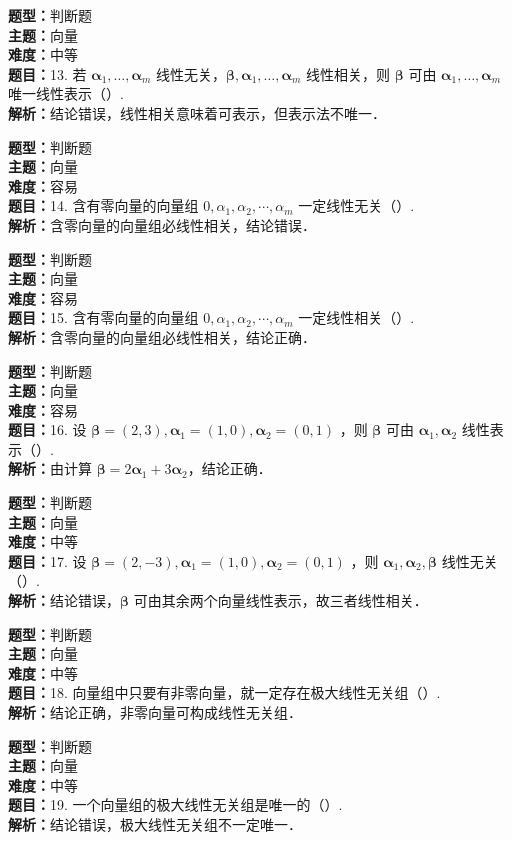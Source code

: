 \documentclass{ctexart}
\newenvironment{question}[5]{%
	\noindent\textbf{题型：}#1\\
	\textbf{主题：}#2\\
	\textbf{难度：}#3\\
	\textbf{题目：}#4\\
	\textbf{解析：}#5\\
	\vspace{1em}
}{}
\begin{document}
	\begin{question}
		{判断题}
		{向量}
		{中等}
		{13. 若 \(\boldsymbol{\alpha}_1,\dots,\boldsymbol{\alpha}_m\) 线性无关，\(\boldsymbol{\beta}, \boldsymbol{\alpha}_1,\dots,\boldsymbol{\alpha}_m\) 线性相关，则 \(\boldsymbol{\beta}\) 可由 \(\boldsymbol{\alpha}_1,\dots,\boldsymbol{\alpha}_m\) 唯一线性表示（）. }
		{结论错误，线性相关意味着可表示，但表示法不唯一．}
	\end{question}
	
	\begin{question}
		{判断题}
		{向量}
		{容易}
		{14. 含有零向量的向量组 \(0, \alpha_1, \alpha_2, \cdots, \alpha_m\) 一定线性无关（）. }
		{含零向量的向量组必线性相关，结论错误．}
	\end{question}
	
	\begin{question}
		{判断题}
		{向量}
		{容易}
		{15. 含有零向量的向量组 \(0, \alpha_1, \alpha_2, \cdots, \alpha_m\) 一定线性相关（）. }
		{含零向量的向量组必线性相关，结论正确．}
	\end{question}
	
	\begin{question}
		{判断题}
		{向量}
		{容易}
		{16. 设 \(\boldsymbol{\beta}=(2,3), \boldsymbol{\alpha}_1=(1,0), \boldsymbol{\alpha}_2=(0,1)\) ，则 \(\boldsymbol{\beta}\) 可由 \(\boldsymbol{\alpha}_1, \boldsymbol{\alpha}_2\) 线性表示（）. }
		{由计算 \(\boldsymbol{\beta}=2\boldsymbol{\alpha}_1+3\boldsymbol{\alpha}_2\)，结论正确．}
	\end{question}
	
	\begin{question}
		{判断题}
		{向量}
		{中等}
		{17. 设 \(\boldsymbol{\beta}=(2,-3), \boldsymbol{\alpha}_1=(1,0), \boldsymbol{\alpha}_2=(0,1)\) ，则 \(\boldsymbol{\alpha}_1, \boldsymbol{\alpha}_2, \boldsymbol{\beta}\) 线性无关（）. }
		{结论错误，\(\boldsymbol{\beta}\) 可由其余两个向量线性表示，故三者线性相关．}
	\end{question}
	
	\begin{question}
		{判断题}
		{向量}
		{中等}
		{18. 向量组中只要有非零向量，就一定存在极大线性无关组（）. }
		{结论正确，非零向量可构成线性无关组．}
	\end{question}
	
	\begin{question}
		{判断题}
		{向量}
		{中等}
		{19. 一个向量组的极大线性无关组是唯一的（）. }
		{结论错误，极大线性无关组不一定唯一．}
	\end{question}
	
\end{document}
